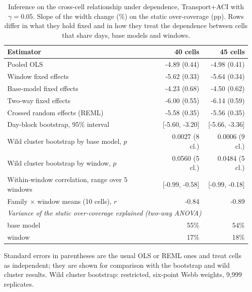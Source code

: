 \begin{table}[tp]
\centering
\footnotesize
\caption{Inference on the cross-cell relationship under dependence, Transport+ACI with $\gamma=0.05$. Slope of the width change (\%) on the static over-coverage (pp). Rows differ in what they hold fixed and in how they treat the dependence between cells that share days, base models and windows.}
\label{tab:inferencia}
\begin{tabular}{l rr}
\toprule
Estimator & 40 cells & 45 cells \\
\midrule
Pooled OLS & -4.89 (0.44) & -4.98 (0.41) \\
Window fixed effects & -5.62 (0.33) & -5.64 (0.34) \\
Base-model fixed effects & -4.23 (0.68) & -4.50 (0.62) \\
Two-way fixed effects & -6.00 (0.55) & -6.14 (0.59) \\
Crossed random effects (REML) & -5.58 (0.35) & -5.56 (0.35) \\
Day-block bootstrap, 95\% interval & [-5.60, -3.20] & [-5.66, -3.36] \\
Wild cluster bootstrap by base model, $p$ & 0.0027 (8 cl.) & 0.0006 (9 cl.) \\
Wild cluster bootstrap by window, $p$ & 0.0560 (5 cl.) & 0.0484 (5 cl.) \\
Within-window correlation, range over 5 windows & [-0.99, -0.58] & [-0.99, -0.18] \\
Family $\times$ window means (10 cells), $r$ & -0.84 & -0.89 \\
\midrule
\multicolumn{3}{l}{\textit{Variance of the static over-coverage explained (two-way ANOVA)}} \\
\quad base model & 55\% & 54\% \\
\quad window & 17\% & 18\% \\
\bottomrule
\end{tabular}

\smallskip\parbox{0.95\linewidth}{\scriptsize Standard errors in parentheses are the usual OLS or REML ones and treat cells as independent; they are shown for comparison with the bootstrap and wild cluster results. Wild cluster bootstrap: restricted, six-point Webb weights, 9{,}999 replicates.}
\end{table}

